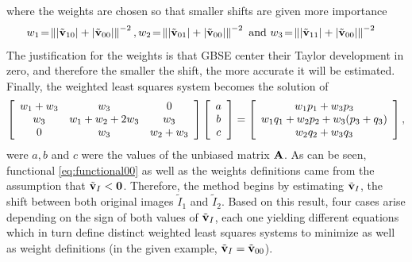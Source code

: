 where the weights are chosen so that smaller shifts are given more importance
\begin{align}
w_1\!&=\!\left\lVert |\tilde{\mathbf{v}}_{10}|+|\tilde{\mathbf{v}}_{00}|\right\rVert^{-2}, w_2\!=\!\left\lVert|\tilde{\mathbf{v}}_{01}|+|\tilde{\mathbf{v}}_{00}|\right\rVert^{-2}\text{ and } w_3\!=\!\left\lVert|\tilde{\mathbf{v}}_{11}|+|\tilde{\mathbf{v}}_{00}|\right\rVert^{-2}
\end{align}
The justification for the weights is that GBSE center their Taylor development in zero, and therefore the smaller the shift, the more accurate it will be estimated. 
Finally, the weighted least squares system becomes the solution of
\begin{align}
\label{eq:finalEq00}
\left[
\begin{array}{c c c}
w_1 + w_3 & w_3 & 0\\
w_3 & w_1 + w_2 + 2w_3 & w_3\\
0 & w_3 & w_2 + w_3
\end{array}
\right]
\left[
\begin{array}{c}
a\\
b\\
c\\
\end{array}
\right]
= \left[
\begin{array}{c}
w_1p_1 + w_3p_3\\
w_1q_1 + w_2p_2 + w_3(p_3 + q_3)\\
w_2q_2 + w_3q_3\\
\end{array}
\right],
\end{align}
were $a, b$ and $c$ were the values of the unbiased matrix $\mathbf{A}$.
As can be seen, functional \eqref{eq:functional00} as well as the weights definitions came from the assumption that $\tilde{\mathbf{v}}_I < \mathbf{0}$. Therefore, the method begins by estimating $\tilde{\mathbf{v}}_I$, the shift between both original images $\tilde{I}_1$ and $\tilde{I}_2$. Based on this result, four cases arise depending on the sign of both values of $\tilde{\mathbf{v}}_I$, each one yielding different equations which in turn define distinct weighted least squares systems to minimize as well as weight definitions (in the given example, $\tilde{\mathbf{v}}_I = \tilde{\mathbf{v}}_{00}$). %

